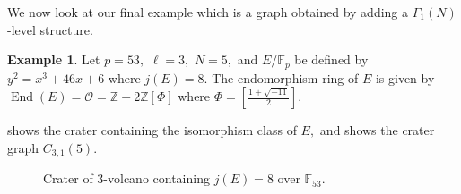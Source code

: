 \documentclass[11pt,a4paper]{amsart}
\theoremstyle{plain}
\theoremstyle{definition}
\newtheorem{eg}[thm]{Example}
\theoremstyle{remark}
\DeclareMathOperator{\Endo}{End}
\begin{document}
We now look at our final example which is a graph obtained by adding a $\Gamma_1(N)$-level structure.
\begin{eg}\label{eg:diff-crater-sizes}
  Let $p = 53,$ $\ell = 3,$ $N = 5,$ and $E/\mathbb{F}_p$ be defined by $y^2 = x^3 + 46x + 6$ where $j(E) = 8.$ The endomorphism ring of $E$ is given by $\Endo(E) = \mathcal{O} = \mathbb{Z} + 2 \mathbb{Z}[\Phi]$ where $\Phi = \left[ \frac{1+\sqrt{-11}}{2}\right].$

   shows the crater containing the isomorphism class of $E,$ and  shows the crater graph $C_{3,1}(5).$
  \begin{figure}[!hbtp]
    \centering
    \caption{Crater of 3-volcano containing $j(E) = 8$ over
      $\mathbb{F}_{53}.$}\label{fig:eg-ell-crater-j8-2}
  \end{figure}


\end{eg}
\end{document}
